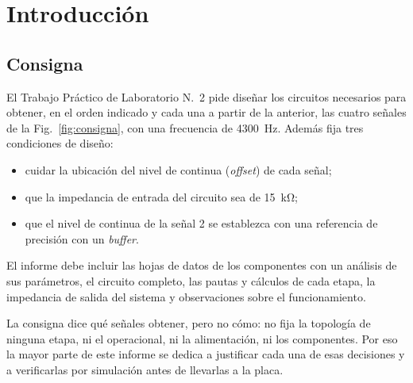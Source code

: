 \section{Introducción}

\subsection{Consigna}
El Trabajo Práctico de Laboratorio N.\textordmasculine\ 2 pide diseñar los circuitos necesarios para obtener, en el orden indicado y cada una a partir de la anterior, las cuatro señales de la Fig.~\ref{fig:consigna}, con una frecuencia de \SI{4300}{\hertz}. Además fija tres condiciones de diseño:
\begin{itemize}[leftmargin=*, nosep]
    \item cuidar la ubicación del nivel de continua (\emph{offset}) de cada señal;
    \item que la impedancia de entrada del circuito sea de \SI{15}{\kilo\ohm};
    \item que el nivel de continua de la señal 2 se establezca con una referencia de precisión con un \emph{buffer}.
\end{itemize}
El informe debe incluir las hojas de datos de los componentes con un análisis de sus parámetros, el circuito completo, las pautas y cálculos de cada etapa, la impedancia de salida del sistema y observaciones sobre el funcionamiento.

La consigna dice qué señales obtener, pero no cómo: no fija la topología de ninguna etapa, ni el operacional, ni la alimentación, ni los componentes. Por eso la mayor parte de este informe se dedica a justificar cada una de esas decisiones y a verificarlas por simulación antes de llevarlas a la placa.

